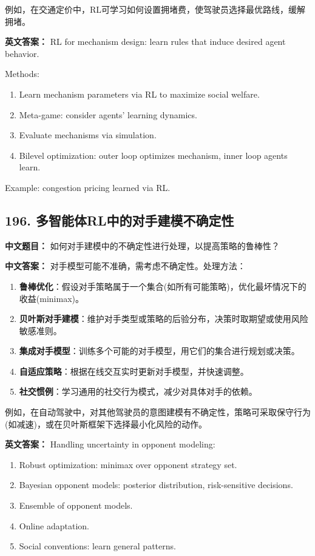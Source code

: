 \documentclass[10pt,a4paper]{ctexart}
\begin{document}
例如，在交通定价中，RL可学习如何设置拥堵费，使驾驶员选择最优路线，缓解拥堵。

\textbf{英文答案：}  
RL for mechanism design: learn rules that induce desired agent behavior.

Methods:
\begin{enumerate}
    \item Learn mechanism parameters via RL to maximize social welfare.
    \item Meta-game: consider agents' learning dynamics.
    \item Evaluate mechanisms via simulation.
    \item Bilevel optimization: outer loop optimizes mechanism, inner loop agents learn.
\end{enumerate}

Example: congestion pricing learned via RL.

\subsection*{196. 多智能体RL中的对手建模不确定性}
\textbf{中文题目：} 如何对手建模中的不确定性进行处理，以提高策略的鲁棒性？

\textbf{中文答案：}  
对手模型可能不准确，需考虑不确定性。处理方法：

\begin{enumerate}
    \item \textbf{鲁棒优化}：假设对手策略属于一个集合(如所有可能策略)，优化最坏情况下的收益(minimax)。
    \item \textbf{贝叶斯对手建模}：维护对手类型或策略的后验分布，决策时取期望或使用风险敏感准则。
    \item \textbf{集成对手模型}：训练多个可能的对手模型，用它们的集合进行规划或决策。
    \item \textbf{自适应策略}：根据在线交互实时更新对手模型，并快速调整。
    \item \textbf{社交惯例}：学习通用的社交行为模式，减少对具体对手的依赖。
\end{enumerate}

例如，在自动驾驶中，对其他驾驶员的意图建模有不确定性，策略可采取保守行为(如减速)，或在贝叶斯框架下选择最小化风险的动作。

\textbf{英文答案：}  
Handling uncertainty in opponent modeling:

\begin{enumerate}
    \item Robust optimization: minimax over opponent strategy set.
    \item Bayesian opponent models: posterior distribution, risk-sensitive decisions.
    \item Ensemble of opponent models.
    \item Online adaptation.
    \item Social conventions: learn general patterns.
\end{enumerate}
\end{document}
